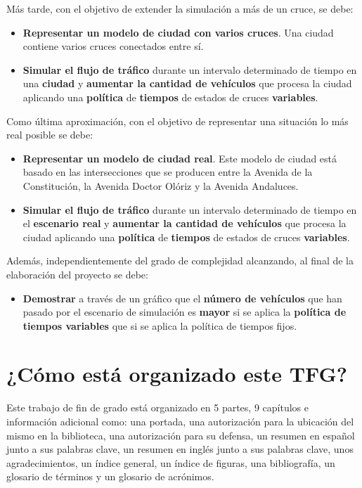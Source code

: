 Más tarde, con el objetivo de extender la simulación a más de un cruce, se debe:
\begin{itemize}
    \item \textbf{Representar un modelo de ciudad con varios cruces}. Una ciudad contiene varios cruces conectados entre sí.
    \item \textbf{Simular el flujo de tráfico} durante un intervalo determinado de tiempo en una \textbf{ciudad} y \textbf{aumentar la cantidad de vehículos} que procesa la ciudad aplicando una \textbf{política} de \textbf{tiempos} de estados de cruces \textbf{variables}.
\end{itemize}

Como última aproximación, con el objetivo de representar una situación lo más real posible se debe:
\begin{itemize}
    \item \textbf{Representar un modelo de ciudad real}. Este modelo de ciudad está basado en las intersecciones que se producen entre la Avenida de la Constitución, la Avenida Doctor Olóriz y la Avenida Andaluces.
    \item \textbf{Simular el flujo de tráfico} durante un intervalo determinado de tiempo en el \textbf{escenario real} y \textbf{aumentar la cantidad de vehículos} que procesa la ciudad aplicando una \textbf{política} de \textbf{tiempos} de estados de cruces \textbf{variables}.
\end{itemize}

Además, independientemente del grado de complejidad alcanzando, al final de la elaboración del proyecto se debe:
\begin{itemize}
    \item \textbf{Demostrar} a través de un gráfico que el \textbf{número de vehículos} que han pasado por el escenario de simulación es \textbf{mayor} si se aplica la \textbf{política de tiempos variables} que si se aplica la política de tiempos fijos.
\end{itemize}

\section{¿Cómo está organizado este TFG?}
Este trabajo de fin de grado está organizado en 5 partes, 9 capítulos e información adicional como: una portada, una autorización para la ubicación del mismo en la biblioteca, una autorización para su defensa, un resumen en español junto a sus palabras clave, un resumen en inglés junto a sus palabras clave, unos agradecimientos, un índice general, un índice de figuras, una bibliografía, un glosario de términos y un glosario de acrónimos.

